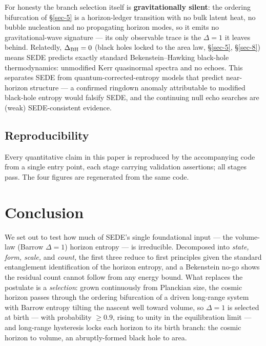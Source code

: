 \documentclass[aps,prd,preprint,nofootinbib,superscriptaddress]{revtex4-2}
\begin{document}
For honesty the branch selection itself is \textbf{gravitationally
silent}: the ordering bifurcation of §\ref{sec-5} is a horizon-ledger
transition with no bulk latent heat, no bubble nucleation and no
propagating horizon modes, so it emits no gravitational-wave signature
--- its only observable trace is the \(\Delta = 1\) it leaves behind.
Relatedly, \(\Delta_{\rm BH} = 0\) (black holes locked to the area law,
§\ref{sec-5}, §\ref{sec-8}) means SEDE predicts exactly standard
Bekenstein--Hawking black-hole thermodynamics: unmodified Kerr
quasinormal spectra and no echoes. This separates SEDE from
quantum-corrected-entropy models that predict near-horizon structure ---
a confirmed ringdown anomaly attributable to modified black-hole entropy
would falsify SEDE, and the continuing null echo searches are (weak)
SEDE-consistent evidence.

\subsection{Reproducibility}\label{reproducibility}

Every quantitative claim in this paper is reproduced by the accompanying
code from a single entry point, each stage carrying validation
assertions; all stages pass. The four figures are regenerated from the
same code.

\section{Conclusion}\label{sec-9}

We set out to test how much of SEDE's single foundational input --- the
volume-law (Barrow \(\Delta  = 1\)) horizon entropy --- is irreducible.
Decomposed into \emph{state, form, scale,} and \emph{count,} the first
three reduce to first principles given the standard entanglement
identification of the horizon entropy, and a Bekenstein no-go shows the
residual count cannot follow from any energy bound. What replaces the
postulate is a \emph{selection}: grown continuously from Planckian size,
the cosmic horizon passes through the ordering bifurcation of a driven
long-range system with Barrow entropy tilting the nascent well toward
volume, so \(\Delta  = 1\) is selected at birth --- with probability
\(\geq  0.9\), rising to unity in the equilibration limit --- and
long-range hysteresis locks each horizon to its birth branch: the cosmic
horizon to volume, an abruptly-formed black hole to area.
\end{document}
